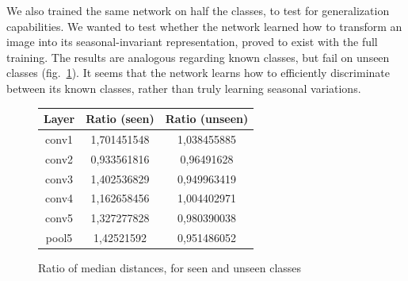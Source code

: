 We also trained the same network on half the classes, to test for generalization capabilities. We wanted to test whether the network learned how to transform an image into its seasonal-invariant representation, proved to exist with the full training. The results are analogous regarding known classes, but fail on unseen classes (fig.~\ref{halftrainvalues}). It seems that the network learns how to efficiently discriminate between its known classes, rather than truly learning seasonal variations.

\begin{figure}[htb]
\centering
\begin{tabular}{|c|c|c|}
  \hline
   Layer & Ratio (seen) & Ratio (unseen) \\
  \hline
  conv1 & 1,701451548 & 1,038455885 \\
  conv2 & 0,933561816 & 0,96491628 \\
  conv3 & 1,402536829 & 0,949963419 \\
  conv4 & 1,162658456 & 1,004402971 \\
  conv5 & 1,327277828 & 0,980390038 \\
  pool5 & 1,42521592 & 0,951486052 \\
  \hline
\end{tabular}
\caption{Ratio of median distances, for seen and unseen classes}
\label{halftrainvalues}
\end{figure}